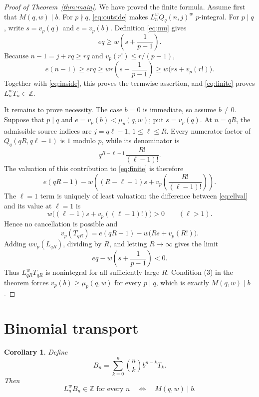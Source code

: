 \documentclass[11pt]{article}
\newtheorem{corollary}[theorem]{Corollary}
\theoremstyle{remark}
\newcommand{\Z}{\mathbb Z}
\begin{document}
\begin{proof}[Proof of Theorem~\ref{thm:main}]
We have proved the finite formula.  Assume first that $M(q,w)\mid b$.
For $p\nmid q$, \eqref{eq:outside} makes
$L_n^wQ_q(n,j)^w$ $p$-integral.  For $p\mid q$, write
$s=v_p(q)$ and $e=v_p(b)$.  Definition \eqref{eq:mu} gives
\begin{equation}\label{eq:density}
 eq\ge w\left(s+\frac1{p-1}\right).
\end{equation}
Because $n-1=j+rq\ge rq$ and
$v_p(r!)\le r/(p-1)$,
\[
 e(n-1)\ge erq
 \ge wr\left(s+\frac1{p-1}\right)
 \ge w\bigl(rs+v_p(r!)\bigr).
\]
Together with \eqref{eq:inside}, this proves the termwise assertion, and
\eqref{eq:finite} proves $L_n^wT_n\in\Z$.

It remains to prove necessity.  The case $b=0$ is immediate, so assume
$b\ne0$.  Suppose that $p\mid q$ and
$e=v_p(b)<\mu_p(q,w)$; put $s=v_p(q)$.  At $n=qR$, the admissible source
indices are $j=q\ell-1$, $1\le\ell\le R$.  Every numerator factor of
$Q_q(qR,q\ell-1)$ is $1$ modulo $p$, while its denominator is
\[
 q^{R-\ell+1}\frac{R!}{(\ell-1)!}.
\]
The valuation of this contribution to \eqref{eq:finite} is therefore
\begin{equation}\label{eq:ellval}
 e(qR-1)-w\left((R-\ell+1)s
 +v_p\left(\frac{R!}{(\ell-1)!}\right)\right).
\end{equation}
The $\ell=1$ term is uniquely of least valuation: the difference between
\eqref{eq:ellval} and its value at $\ell=1$ is
\[
 w\bigl((\ell-1)s+v_p((\ell-1)!)\bigr)>0
 \qquad(\ell>1).
\]
Hence no cancellation is possible and
\begin{equation}\label{eq:exactval}
 v_p(T_{qR})=e(qR-1)-w\bigl(Rs+v_p(R!)\bigr).
\end{equation}
Adding $wv_p(L_{qR})$, dividing by $R$, and letting $R\to\infty$ gives
the limit
\[
 eq-w\left(s+\frac1{p-1}\right)<0.
\]
Thus $L_{qR}^wT_{qR}$ is nonintegral for all sufficiently large $R$.
Condition (3) in the theorem forces $v_p(b)\ge\mu_p(q,w)$ for every
$p\mid q$, which is exactly $M(q,w)\mid b$.
\end{proof}

\section{Binomial transport}

\begin{corollary}\label{cor:transport}
Define
\begin{equation}\label{eq:B}
 B_n=\sum_{k=0}^n\binom nk b^{n-k}T_k.
\end{equation}
Then
\[
 \boxed{\quad
 L_n^wB_n\in\Z\text{ for every }n
 \quad\Longleftrightarrow\quad M(q,w)\mid b.
 \quad}
\]
\end{corollary}
\end{document}

